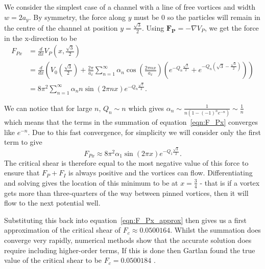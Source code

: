 \documentclass{article}
\numberwithin{equation}{section}
\begin{document}
We consider the simplest case of a channel with a line of free vortices and width $w=2a_y$. By symmetry, the force along $y$ must be $0$ so the particles will remain in the centre of the channel at position $y=\frac{\sqrt{3}}{2}$.
Using $\mathbf{F_P} = -\nabla V_P$, we get the force in the x-direction to be
\begin{align}
    F_{Px} &= \frac{d}{dx}V_P(x, \frac{\sqrt{3}}{2}) \nonumber \\
    &= \frac{d}{dx}\left(V_0\left(\frac{\sqrt{3}}{2}\right) + \frac{2\pi}{a_x}\sum_{n=1}^\infty\alpha_n\cos\left(\frac{2\pi nx}{a_x}\right) \left(e^{-Q_n\frac{\sqrt{3}}{2}}+e^{-Q_n(\sqrt{3}-\frac{\sqrt{3}}{2})}\right)\right) \nonumber \\
    &= 8\pi^2\sum_{n=1}^\infty\alpha_nn\sin(2\pi nx) e^{-Q_n\frac{\sqrt{3}}{2}}. \label{eqn:F_Px}
\end{align}

We can notice that for large $n$, $Q_n\sim n$ which gives $\alpha_n\sim \frac{1}{n(1-(-1)^ne^{-n})}\sim\frac{1}{n}$ which means that the terms in the summation of equation~\ref{eqn:F_Px} converges like $e^{-n}$. Due to this fast convergence, for simplicity we will consider only the first term to give
\begin{equation}
    F_{Px} \approx 8\pi^2\alpha_1\sin(2\pi x) e^{-Q_1\frac{\sqrt{3}}{2}}. \label{eqn:F_Px_approx}
\end{equation}
The critical shear is therefore equal to the most negative value of this force to ensure that $F_P + F_I$ is always positive and the vortices can flow. Differentiating and solving gives the location of this minimum to be at $x=\frac{3}{4}$ - that is if a vortex gets more than three-quarters of the way between pinned vortices, then it will flow to the next potential well.

Substituting this back into equation~\ref{eqn:F_Px_approx} then gives us a first approximation of the critical shear of $F_c \approx 0.0500164$. Whilst the summation does converge very rapidly, numerical methods show that the accurate solution does require including higher-order terms, If this is done then Gartlan found the true value of the critical shear to be $F_c = 0.0500184$ \cite{Gartlan2020NovelFibres}.
\end{document}
